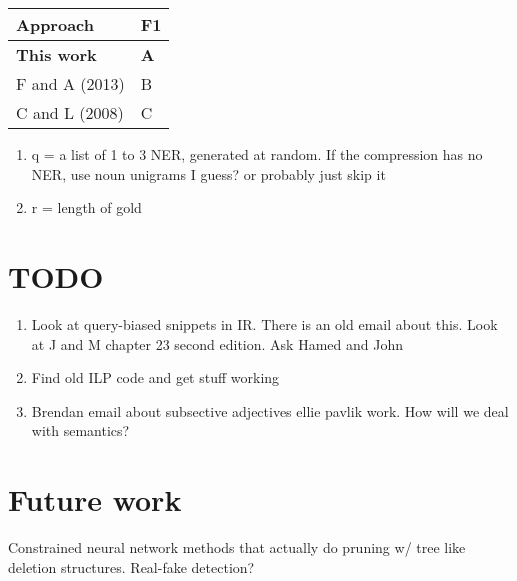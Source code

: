 \documentclass[11pt,a4paper]{article}
\begin{document}
\begin{table}[htb!]
\begin{tabular}{ll}
\centering
Approach & F1 \\ \hline
\textbf{This work}         & \textbf{A}           \\
F and A (2013)    & B           \\
C and L (2008)    & C          
\end{tabular}
\end{table}

\begin{enumerate}
\item{q = a list of 1 to 3 NER, generated at random. If the compression has no NER, use noun unigrams I guess? or probably just skip it}
\item{r = length of gold}
\end{enumerate}



\section{TODO}
\begin{enumerate}
\item{Look at query-biased snippets in IR. There is an old email about this. Look at J and M chapter 23 second edition. Ask Hamed and John}
\item{Find old ILP code and get stuff working}
\item{Brendan email about subsective adjectives ellie pavlik work. How will we deal with semantics? }
\end{enumerate}

\section{Future work}
Constrained neural network methods that actually do pruning w/ tree like deletion structures. 
Real-fake detection?
\end{document}
